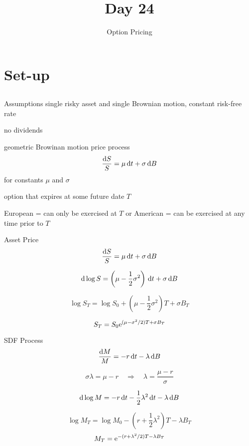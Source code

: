 \documentclass[xcolor=dvipsnames,10pt]{beamer}
\begin{document}
\title{\vskip 0.5in Day 24}
\subtitle{Option Pricing}

\begin{frame}
  \titlepage
\end{frame}

\section{Set-up}\subsection{}
\begin{frame}{Assumptions}
    single risky asset and single Brownian motion, constant risk-free rate
    
    no dividends
    
    geometric Browinan motion price process
    $$\frac{\mathrm{d} S}{S} = \mu\,\mathrm{d} t + \sigma\,\mathrm{d} B$$
    for constants $\mu$ and $\sigma$
    
    option that expires at some future date $T$
    
    European = can only be exercised at $T$ or American = can be exercised at any time prior to $T$
\end{frame}

\begin{frame}{Asset Price}
  $$\frac{\mathrm{d} S}{S} = \mu\,\mathrm{d} t + \sigma\,\mathrm{d} B$$
  \pause
  
  $$\mathrm{d} \log S = \left(\mu - \frac{1}{2}\sigma^2\right)\,\mathrm{d} t + \sigma\,\mathrm{d} B$$
  \pause
  
  $$\log S_T = \log S_0 + \left(\mu - \frac{1}{2}\sigma^2\right)T + \sigma B_T$$
  
  $$S_T = S_0 \mathrm{e}^{(\mu-\sigma^2/2)T + \sigma B_T}$$
  
  
\end{frame}
\begin{frame}{SDF Process}
$$\frac{\mathrm{d} M}{M} = - r\,\mathrm{d} t - \lambda\,\mathrm{d} B$$

$$\sigma\lambda = \mu-r \quad \Rightarrow \quad \lambda = \frac{\mu-r}{\sigma}$$

\pause
$$\mathrm{d} \log M = -r\,\mathrm{d} t - \frac{1}{2}\lambda^2\,\mathrm{d} t - \lambda\,\mathrm{d} B$$

\pause
$$\log M_T = \log M_0 -\left(r + \frac{1}{2}\lambda^2\right)T - \lambda B_T$$
\pause
$$M_T = \mathrm{e}^{-(r+\lambda^2/2)T - \lambda B_T}$$
\end{frame}
\end{document}
